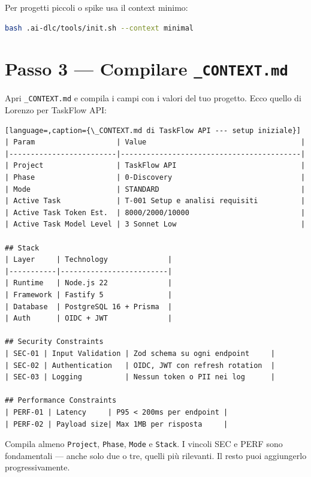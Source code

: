 Per progetti piccoli o spike usa il context minimo:

\begin{lstlisting}[language=bash,caption={Inizializzazione con context minimale}]
bash .ai-dlc/tools/init.sh --context minimal
\end{lstlisting}

\section{Passo 3 --- Compilare \texttt{\_CONTEXT.md}}
\label{sec:02-passo3-context}

Apri \texttt{\_CONTEXT.md} e compila i campi con i valori del tuo progetto. Ecco quello di Lorenzo per TaskFlow API:

\begin{lstlisting}[language=,caption={\_CONTEXT.md di TaskFlow API --- setup iniziale}]
| Param                   | Value                                    |
|-------------------------|------------------------------------------|
| Project                 | TaskFlow API                             |
| Phase                   | 0-Discovery                              |
| Mode                    | STANDARD                                 |
| Active Task             | T-001 Setup e analisi requisiti          |
| Active Task Token Est.  | 8000/2000/10000                          |
| Active Task Model Level | 3 Sonnet Low                             |

## Stack
| Layer     | Technology              |
|-----------|-------------------------|
| Runtime   | Node.js 22              |
| Framework | Fastify 5               |
| Database  | PostgreSQL 16 + Prisma  |
| Auth      | OIDC + JWT              |

## Security Constraints
| SEC-01 | Input Validation | Zod schema su ogni endpoint     |
| SEC-02 | Authentication   | OIDC, JWT con refresh rotation  |
| SEC-03 | Logging          | Nessun token o PII nei log      |

## Performance Constraints
| PERF-01 | Latency     | P95 < 200ms per endpoint |
| PERF-02 | Payload size| Max 1MB per risposta     |
\end{lstlisting}

\begin{tipbox}
Compila almeno \texttt{Project}, \texttt{Phase}, \texttt{Mode} e \texttt{Stack}. I vincoli SEC e PERF sono fondamentali --- anche solo due o tre, quelli più rilevanti. Il resto puoi aggiungerlo progressivamente.
\end{tipbox}

